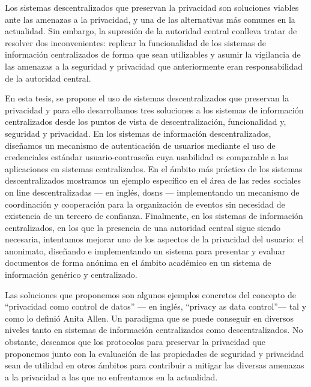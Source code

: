     Los sistemas descentralizados que preservan la privacidad son soluciones viables  
    ante las amenazas a la privacidad, y una de las alternativas más comunes en 
    la actualidad. Sin embargo, la supresión de la autoridad central conlleva tratar 
    de resolver dos inconvenientes: replicar la funcionalidad de los sistemas 
    de información centralizados de forma que sean utilizables y asumir la vigilancia  
    de las amenazas a la seguridad y privacidad que anteriormente eran responsabilidad 
    de la autoridad central.
    
    En esta tesis, se propone el uso de sistemas descentralizados que preservan 
    la privacidad y para ello desarrollamos tres soluciones a los sistemas de información 
    centralizados desde los puntos de vista de descentralización, funcionalidad 
    y, seguridad y privacidad. En los sistemas de información descentralizados, 
    diseñamos un mecanismo de autenticación de usuarios mediante el uso de credenciales 
    estándar usuario-contraseña cuya usabilidad es comparable a las aplicaciones 
    en sistemas centralizados. En el ámbito más práctico de los sistemas descentralizados 
    mostramos un ejemplo específico en el área de las redes sociales on line descentralizadas 
    --- en inglés, \aclp*{dosn} --- implementando un mecanismo de coordinación y 
    cooperación para la organización de eventos sin necesidad de existencia de un 
    tercero de confianza. Finalmente, en los sistemas de información centralizados, 
    en los que la presencia de una autoridad central sigue siendo necesaria, intentamos 
    mejorar uno de los aspectos de la privacidad del usuario: el anonimato, diseñando 
    e implementando un sistema para presentar y evaluar documentos de forma anónima 
    en el ámbito académico en un sistema de información genérico y centralizado.
    
    Las soluciones que proponemos son algunos ejemplos concretos del concepto de 
    ``privacidad como control de datos'' --- en inglés, ``privacy as data control''--- 
    tal y como lo definió Anita Allen. Un paradigma que se puede conseguir en diversos 
    niveles tanto en sistemas de información centralizados como descentralizados. 
    No obstante, deseamos que los protocolos para preservar la privacidad que proponemos 
    junto con la evaluación de las propiedades de seguridad y privacidad sean de 
    utilidad en otros ámbitos para contribuir a mitigar las diversas amenazas a 
    la privacidad a las que no enfrentamos en la actualidad.
    
